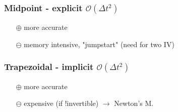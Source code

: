     \subsubsection{Midpoint - explicit \texorpdfstring{\hfill $\mathcal{O}(\Delta t^2)$}{O(t2)}}
        \vspace{0.5em}
        \vspace{-1em}
        \begin{itemize}
            \item[$\oplus$] more accurate
            \item[$\ominus$] memory intensive, "jumpstart" (need for two IV)
        \end{itemize}
    \subsubsection{Trapezoidal - implicit \texorpdfstring{\hfill $\mathcal{O}(\Delta t^2)$}{O(t2)}}\label{subsubsec::trapezoidal_DM}
        \vspace{0.5em}
        \begin{minipage}{0.9\linewidth}
            \begin{itemize}
                \item[$\oplus$] more accurate
                \item[$\ominus$] expensive (if !invertible) $\rightarrow$ Newton's M.
            \end{itemize}
        \end{minipage}
